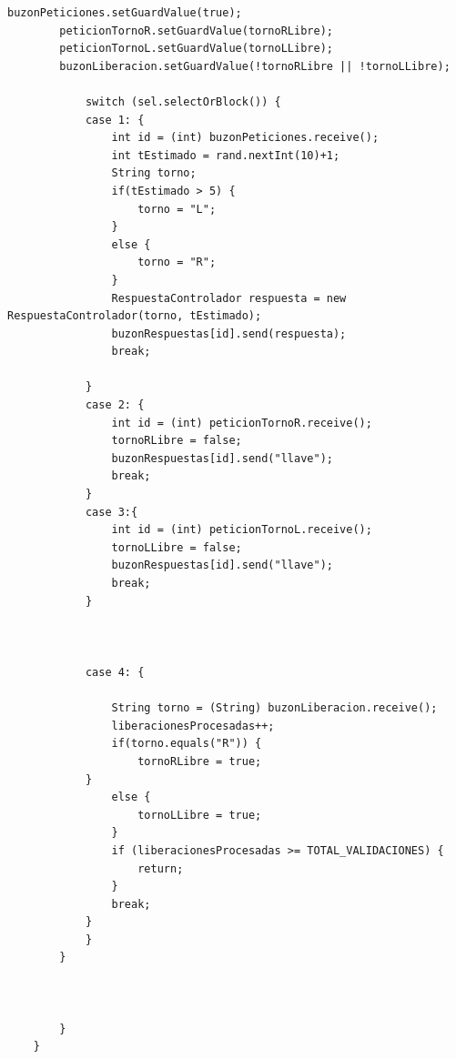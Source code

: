\documentclass[12pt,a4paper]{article}
\begin{document}
\begin{lstlisting}[caption={HiloControlador.java}]
		buzonPeticiones.setGuardValue(true);
		peticionTornoR.setGuardValue(tornoRLibre);
		peticionTornoL.setGuardValue(tornoLLibre);
        buzonLiberacion.setGuardValue(!tornoRLibre || !tornoLLibre);
   
			switch (sel.selectOrBlock()) {
			case 1: {
				int id = (int) buzonPeticiones.receive();
				int tEstimado = rand.nextInt(10)+1;
				String torno;
				if(tEstimado > 5) {
					torno = "L";
				}
				else {
					torno = "R";
				}
				RespuestaControlador respuesta = new RespuestaControlador(torno, tEstimado);
				buzonRespuestas[id].send(respuesta);
				break;
				
			}
			case 2: {
				int id = (int) peticionTornoR.receive();
				tornoRLibre = false;
				buzonRespuestas[id].send("llave");
				break;
			}
			case 3:{
				int id = (int) peticionTornoL.receive();
				tornoLLibre = false;
				buzonRespuestas[id].send("llave");
				break;
			}
				
				
		
			case 4: {
				
				String torno = (String) buzonLiberacion.receive();
				liberacionesProcesadas++;
				if(torno.equals("R")) {
					tornoRLibre = true;
			}
				else {
					tornoLLibre = true;
				}
				if (liberacionesProcesadas >= TOTAL_VALIDACIONES) {
					return;
				}
				break;
			}
			}
        }
			
	
			
		}
	}

		
		
	



\end{lstlisting}
\end{document}
